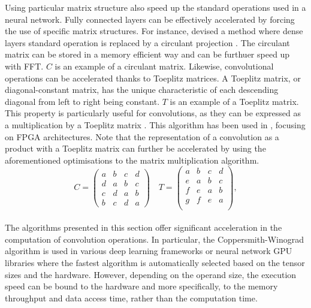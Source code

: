 Using particular matrix structure also speed up the standard operations used in
a neural network. Fully connected layers can be effectively accelerated by
forcing the use of specific matrix structures. For instance,
\citeauthor{DBLP:conf/iccv/ChengYFKCC15} devised a method where dense layers
standard operation is replaced by a circulant projection
\cite{DBLP:conf/iccv/ChengYFKCC15}. The circulant matrix can be stored in a
memory efficient way and can be furthuer speed up with \ac{FFT}. $C$ is an
example of a circulant matrix. Likewise, convolutional operations can be
accelerated thanks to Toeplitz matrices. A Toeplitz matrix, or diagonal-constant
matrix, has the unique characteristic of each descending diagonal from left to
right being constant. $T$ is an example of a Toeplitz matrix. This property is
particularly useful for convolutions, as they can be expressed as a
multiplication by a Toeplitz matrix \cite{gray2006toeplitz}. This algorithm has
been used in \cite{liao2019compressing}, focusing on \ac{FPGA} architectures.
Note that the representation of a convolution as a product with a Toeplitz
matrix can further be accelerated by using the aforementioned optimisations to
the matrix multiplication algorithm.\\

\[
C = 
\begin{pmatrix}
    a & b & c & d \\
    d & a & b & c \\
    c & d & a & b \\
    b & c & d & a
\end{pmatrix}
\quad
T = 
\begin{pmatrix}
a & b & c & d \\
e & a & b & c \\
f & e & a & b \\
g & f & e & a \\
\end{pmatrix},
\]\\



The algorithms presented in this section offer significant acceleration in the
computation of convolution operations. In particular, the Coppersmith-Winograd
algorithm is used in various deep learning frameworks
\cite{DBLP:journals/corr/AbadiABBCCCDDDG16,DBLP:conf/nips/PaszkeGMLBCKLGA19} or
neural network \ac{GPU} libraries \cite{nvidia_cudnn} where the fastest
algorithm is automatically selected based on the tensor sizes and the hardware.
However, depending on the operand size, the execution speed can be bound to the
hardware and more specifically, to the memory throughput and data access time,
rather than the computation time.
\cite{DBLP:journals/pc/WhaleyPD01,DBLP:journals/cca/DrevetIS10}

